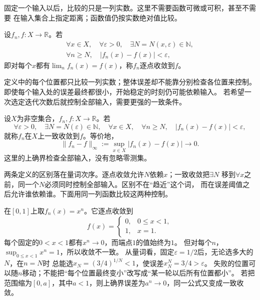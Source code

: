 固定一个输入以后，比较的只是一列实数。这里不需要函数可微或可积，甚至不需要
在输入集合上指定距离；函数值仍按实数绝对值比较。
\begin{definition}[逐点收敛]
\label{def:analysis-pointwise-almost-everywhere-convergence}
设$f_n,f:X\to\mathbb{R}$。若
\[
 \begin{gathered}
  \forall x\in X,\quad
  \forall\varepsilon>0,\quad
  \exists N=N(x,\varepsilon)\in\mathbb N,\\
  \forall n\geq N,\quad
  |f_n(x)-f(x)|<\varepsilon,
 \end{gathered}
\]
即对每个$x$都有$\lim_n f_n(x)=f(x)$，称$f_n$逐点收敛到$f$。
\end{definition}


定义中的每个位置都只比较一列实数；整体误差却不能靠分别检查各位置来控制。
即使每个输入处的误差最终都很小，开始稳定的时刻仍可能依赖输入。
若希望一次选定迭代次数后就控制全部输入，需要更强的一致条件。
\begin{definition}[函数列的一致收敛]
\label{def:analysis-uniform-convergence}
设$X$为非空集合，$f_n,f:X\to\mathbb R$。若
\[
  \forall\varepsilon>0,\quad
  \exists N=N(\varepsilon)\in\mathbb N,\quad
  \forall x\in X,\quad
  \forall n\geq N,\quad
  |f_n(x)-f(x)|<\varepsilon,
\]
就称$f_n$在$X$上一致收敛到$f$。等价地，
\begin{equation}
  \lVert f_n-f\rVert_{\infty}
  :=
  \sup_{x\in X}|f_n(x)-f(x)|
  \longrightarrow0.
\label{eq:analysis-uniform-convergence}
\end{equation}
这里的上确界检查全部输入，没有忽略零测集。
\end{definition}


两条定义的区别落在量词次序。逐点收敛允许$N$依赖$x$；一致收敛把$\exists N$
移到$\forall x$之前，同一个$N$必须同时控制全部输入。区别不在“趋近”这个词，
而在误差阈值之后允许谁依赖谁。下面用同一列函数比较这两种控制。

在$[0,1]$上取$f_n(x)=x^n$。它逐点收敛到
\[
 f(x)=
 \begin{cases}
  0,&0\leq x<1,\\
  1,&x=1.
 \end{cases}
\]
每个固定的$0<x<1$都有$x^n\to0$，而端点$1$的值始终为$1$。
但对每个$n$，$\sup_{0\leq x<1}x^n=1$，所以收敛不一致。
从量词看，固定$\varepsilon=1/2$后，无论选多大的$N$，在$n=N$时
总能选$x_N=(3/4)^{1/N}<1$，使误差$x_N^N=3/4>\varepsilon$。
失败的位置可以随$n$移动；不能把“每个位置最终变小”改写成“某一轮以后所有位置都小”。
若把范围缩为$[0,a]$，其中$a<1$，则上确界误差为$a^n\to0$，同一公式又变成一致收敛。

